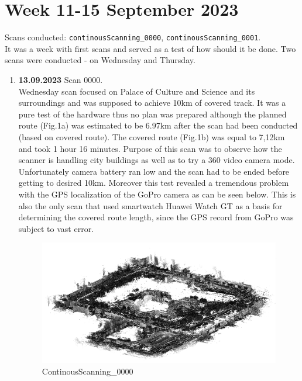 \documentclass[a4paper,12pt]{book}
\begin{document}
\section{Week 11-15 September 2023}
Scans conducted: \verb|continousScanning_0000|, \verb|continousScanning_0001|.\\
It was a week with first scans and served as a test of how should it be done. Two scans were conducted - on Wednesday and Thursday.
\begin{enumerate}
	\item \textbf{13.09.2023} Scan 0000. \\
	 Wednesday scan focused on Palace of Culture and Science and its surroundings and was supposed to achieve 10km of covered track. It was a pure test of the hardware thus no plan was prepared although the planned route (Fig.1a) was estimated to be 6.97km after the scan had been conducted (based on covered route). The covered route (Fig.1b) was equal to 7,12km and took 1 hour 16 minutes. Purpose of this scan was to observe how the scanner is handling city buildings as well as to try a 360 video camera mode. Unfortunately camera battery ran low and the scan had to be ended before getting to desired 10km. Moreover this test revealed a tremendous problem with the GPS localization of the GoPro camera as can be seen below. This is also the only scan that used smartwatch Huawei Watch GT as a basis for determining the covered route length, since the GPS record from GoPro was subject to vast error.
	 \begin{figure}[H]
 		\includegraphics[width=1\linewidth]{cloud0}
	 	\caption{ContinousScanning\_0000}
	 \end{figure}
	\begin{figure}[H]
		\centering
		\begin{subfigure}{.90\textwidth}
			\centering

\end{subfigure}
\end{figure}
\end{enumerate}
\end{document}
